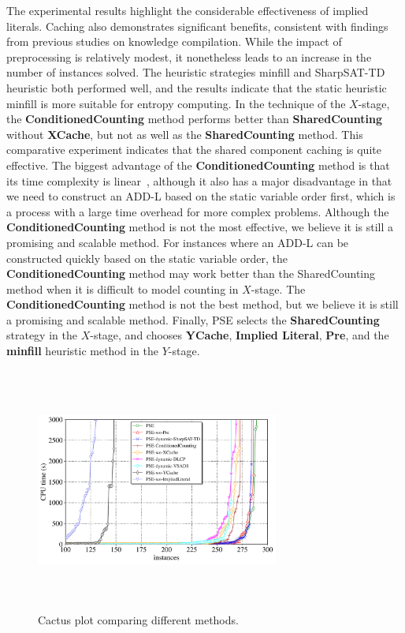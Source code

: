 The experimental results highlight the considerable effectiveness of implied literals. 
Caching also demonstrates significant benefits, consistent with findings from previous studies on knowledge compilation. 
While the impact of preprocessing is relatively modest, it nonetheless leads to an increase in the number of instances solved.
The heuristic strategies minfill and SharpSAT-TD heuristic both performed well, and the results indicate that the static heuristic minfill is more suitable for entropy computing.
In the technique of the $X$-stage, the \textbf{ConditionedCounting} method performs better than \textbf{SharedCounting} without \textbf{XCache}, but not as well as the \textbf{SharedCounting} method.
This comparative experiment indicates that the shared component caching is quite effective.
The biggest advantage of the \textbf{ConditionedCounting} method is that its time complexity is linear~\cite{lai2017new}, although it also has a major disadvantage in that we need to construct an ADD-L based on the static variable order first, which is a process with a large time overhead for more complex problems.
Although the \textbf{ConditionedCounting} method is not the most effective, we believe it is still a promising and scalable method. 
For instances where an ADD-L can be constructed quickly based on the static variable order, the \textbf{ConditionedCounting} method may work better than the SharedCounting method when it is difficult to model counting in $X$-stage. 
The \textbf{ConditionedCounting} method is not the best method, but we believe it is still a promising and scalable method.
Finally, PSE selects the \textbf{SharedCounting} strategy in the $X$-stage, and chooses \textbf{YCache}, \textbf{Implied Literal}, \textbf{Pre}, and the \textbf{minfill} heuristic method in the $Y$-stage.
	
\begin{figure}[htbp]
	\centering
	\includegraphics[width=8cm,height=8cm]{figures/Configuration_compare.pdf}
	\caption{Cactus plot comparing different methods.}
	\label{figure:3}
\end{figure} 



